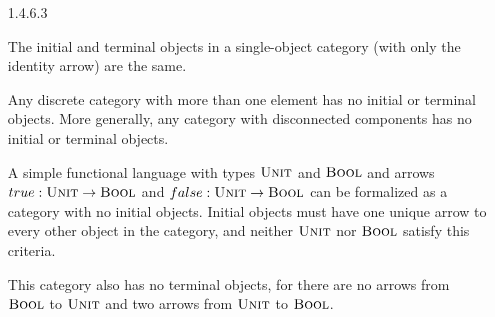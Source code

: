\documentclass{article}
\begin{document}
\begin{enumerate}
\item[1.4.6.3]
  
  The initial and terminal objects in a single-object category (with only the identity arrow) are the same.

  Any discrete category with more than one element has no initial or terminal objects.
  More generally, any category with disconnected components has no initial or terminal objects.

  A simple functional language with types $\textsc{Unit}$ and $\textsc{Bool}$
  and arrows 
  $true: \textsc{Unit} \rightarrow \textsc{Bool}$ and
  $false: \textsc{Unit} \rightarrow \textsc{Bool}$
  can be formalized as a category with no initial objects.
  Initial objects must have one unique arrow to every other object in the 
  category, and neither $\textsc{Unit}$ nor $\textsc{Bool}$ satisfy
  this criteria.

  This category also has no terminal objects, for 
  there are no arrows from $\textsc{Bool}$ to $\textsc{Unit}$
  and two arrows from $\textsc{Unit}$ to $\textsc{Bool}$.
  
\end{enumerate}
\end{document}
